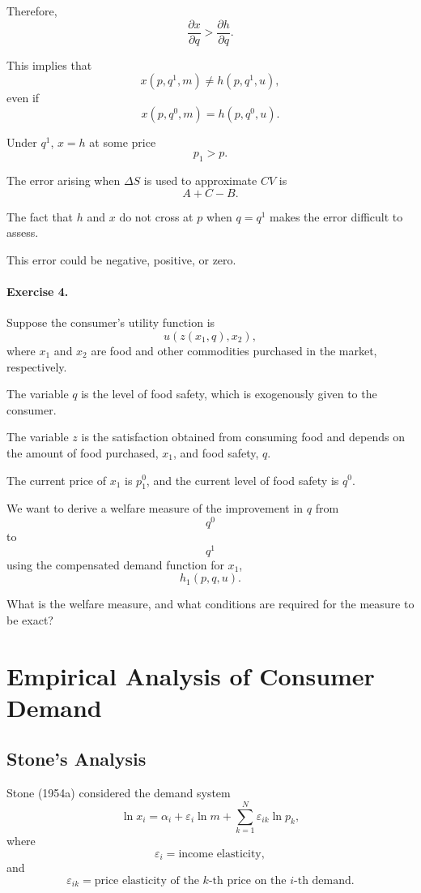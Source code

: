 Therefore,
\[
\frac{\partial x}{\partial q}
>
\frac{\partial h}{\partial q}.
\]

This implies that
\[
x(p,q^1,m)\ne h(p,q^1,u),
\]
even if
\[
x(p,q^0,m)=h(p,q^0,u).
\]

Under \(q^1\), \(x=h\) at some price
\[
p_1>p.
\]

The error arising when \(\Delta S\) is used to approximate \(CV\) is
\[
A+C-B.
\]

The fact that \(h\) and \(x\) do not cross at \(p\) when \(q=q^1\) makes the error difficult to assess.

This error could be negative, positive, or zero.

\paragraph{Exercise 4.}
Suppose the consumer's utility function is
\[
u(z(x_1,q),x_2),
\]
where \(x_1\) and \(x_2\) are food and other commodities purchased in the market, respectively.

The variable \(q\) is the level of food safety, which is exogenously given to the consumer.

The variable \(z\) is the satisfaction obtained from consuming food and depends on the amount of food purchased, \(x_1\), and food safety, \(q\).

The current price of \(x_1\) is \(p_1^0\), and the current level of food safety is \(q^0\).

We want to derive a welfare measure of the improvement in \(q\) from
\[
q^0
\]
to
\[
q^1
\]
using the compensated demand function for \(x_1\),
\[
h_1(p,q,u).
\]

What is the welfare measure, and what conditions are required for the measure to be exact?

\section{Empirical Analysis of Consumer Demand}

\subsection{Stone's Analysis}

Stone (1954a) considered the demand system
\[
\ln x_i
=
\alpha_i
+
\varepsilon_i \ln m
+
\sum_{k=1}^N
\varepsilon_{ik}\ln p_k,
\]
where
\[
\varepsilon_i
=
\text{income elasticity},
\]
and
\[
\varepsilon_{ik}
=
\text{price elasticity of the } k\text{-th price on the } i\text{-th demand}.
\]

